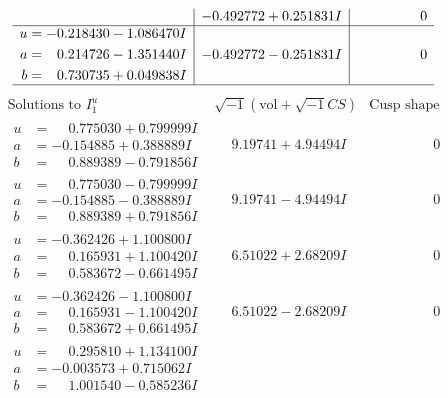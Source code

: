 \documentclass[1p]{elsarticle_modified}
\theoremstyle{definition}
\newcommand{\I}{\sqrt{-1}}
\begin{document}
$$\begin{array}{c|c|c}
 & -0.492772 + 0.251831 I & \phantom{-0.000000 } 0 \\ \hline\begin{aligned}
u &= -0.218430 - 1.086470 I \\
a &= \phantom{-}0.214726 - 1.351440 I \\
b &= \phantom{-}0.730735 + 0.049838 I\end{aligned}
 & -0.492772 - 0.251831 I & \phantom{-0.000000 } 0\\
 \hline 
 \end{array}$$\newpage$$\begin{array}{c|c|c}  
\text{Solutions to }I^u_{1}& \I (\text{vol} + \sqrt{-1}CS) & \text{Cusp shape}\\
 \hline 
\begin{aligned}
u &= \phantom{-}0.775030 + 0.799999 I \\
a &= -0.154885 + 0.388889 I \\
b &= \phantom{-}0.889389 - 0.791856 I\end{aligned}
 & \phantom{-}9.19741 + 4.94494 I & \phantom{-0.000000 } 0 \\ \hline\begin{aligned}
u &= \phantom{-}0.775030 - 0.799999 I \\
a &= -0.154885 - 0.388889 I \\
b &= \phantom{-}0.889389 + 0.791856 I\end{aligned}
 & \phantom{-}9.19741 - 4.94494 I & \phantom{-0.000000 } 0 \\ \hline\begin{aligned}
u &= -0.362426 + 1.100800 I \\
a &= \phantom{-}0.165931 + 1.100420 I \\
b &= \phantom{-}0.583672 - 0.661495 I\end{aligned}
 & \phantom{-}6.51022 + 2.68209 I & \phantom{-0.000000 } 0 \\ \hline\begin{aligned}
u &= -0.362426 - 1.100800 I \\
a &= \phantom{-}0.165931 - 1.100420 I \\
b &= \phantom{-}0.583672 + 0.661495 I\end{aligned}
 & \phantom{-}6.51022 - 2.68209 I & \phantom{-0.000000 } 0 \\ \hline\begin{aligned}
u &= \phantom{-}0.295810 + 1.134100 I \\
a &= -0.003573 + 0.715062 I \\
b &= \phantom{-}1.001540 - 0.585236 I\end{aligned}

\end{array}$$
\end{document}
